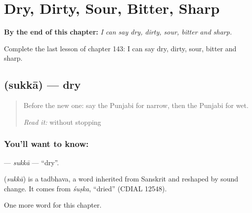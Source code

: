 
\chapter{Dry, Dirty, Sour, Bitter, Sharp}
\label{ch:pa-dry-dirty-sour-bitter-sharp}

\begin{chapteropening}
\textbf{By the end of this chapter:} \emph{I can say dry, dirty, sour, bitter and sharp.}

Complete the last lesson of chapter 143: I can say dry, dirty, sour, bitter and sharp.
\end{chapteropening}

\section[\texorpdfstring{\pa{ਸੁੱਕਾ} (sukkā)}{ਸੁੱਕਾ (sukkā)}]{ (sukkā) — dry}

\label{lesson:PA-C143-sukka}



\begin{quote}
Before the new one: say the Punjabi for narrow, then the Punjabi for wet.

\emph{Read it:} \textbf{       } without stopping
\end{quote}

\subsection*{You'll want to know: }
\textbf{} — \emph{sukkā} — \textquotedblleft{}dry\textquotedblright{}.

\begin{cousinweb}
\textbf{} (\emph{sukkā}) is a tadbhava, a word inherited from Sanskrit and reshaped by sound change. It comes from \emph{śuṣka}, \textquotedblleft{}dried\textquotedblright{} (CDIAL 12548).
\end{cousinweb}

\begin{grammarlens}[title={What you've built}]
One more word for this chapter.
\end{grammarlens}

